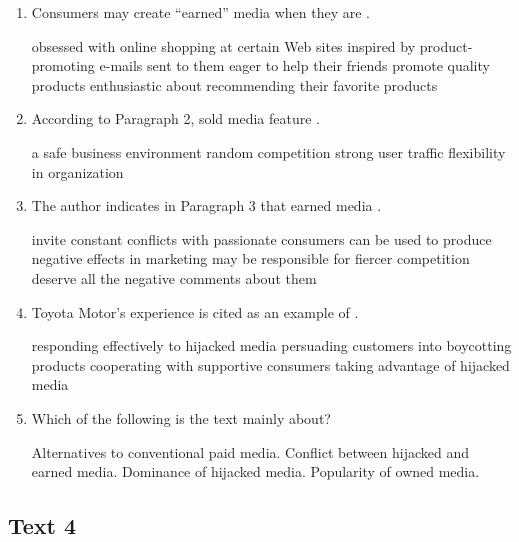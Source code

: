 \begin{enumerate}[resume]
	\item
 Consumers may create ``earned'' media when they are \lineread.


\fourchoices
{obsessed with online shopping at certain Web sites}
{inspired by product-promoting e-mails sent to them}
{eager to help their friends promote quality products}
{enthusiastic about recommending their favorite products}


\item
 According to Paragraph 2, sold media feature \lineread.


\fourchoices
{a safe business environment}
{random competition}
{strong user traffic}
{flexibility in organization}



\item
The author indicates in Paragraph 3 that earned media \lineread.


\fourchoices
{invite constant conflicts with passionate consumers}
{can be used to produce negative effects in marketing}
{may be responsible for fiercer competition}
{deserve all the negative comments about them}


\item
Toyota Motor's experience is cited as an example of \lineread.


\fourchoices
{responding effectively to hijacked media}
{persuading customers into boycotting products}
{cooperating with supportive consumers}
{taking advantage of hijacked media}


\item
Which of the following is the text mainly about?


\fourchoices
{Alternatives to conventional paid media.}
{Conflict between hijacked and earned media.}
{Dominance of hijacked media.}
{Popularity of owned media.}

\end{enumerate}



\newpage
\subsection{Text 4}


